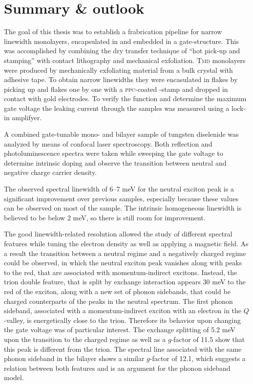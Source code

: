 \chapter{Summary \& outlook}

The goal of this thesis was to establish a frabrication pipeline for narrow linewidth \tmdg monolayers, encapsulated in \hbng and embedded in a gate-structure. This was accomplished by combining the dry transfer technique of ``hot pick-up and stamping'' \cite{pizzocchero_hot_2016, tien_study_2016} with contact lithography and mechanical exfoliation. \textsc{Tmd} monolayers were produced by mechanically exfoliating material from a bulk crystal with adhesive tape. To obtain narrow linewidths they were encasulated in \hbng flakes by picking up \hbng and \tmdg flakes one by one with a \textsc{ppc}-coated \pdms-stamp and dropped in contact with gold electrodes. To verify the function and determine the maximum gate voltage the leaking current through the samples was measured using a lock-in amplifyer.

A combined gate-tunable mono- and bilayer sample of tungsten diselenide was analyzed by means of confocal laser spectroscopy. Both reflection and photoluminescence spectra were taken while sweeping the gate voltage to determine intrinsic doping and observe the transition between neutral and negative charge carrier density.

The observed spectral linewidth of 6--7 meV for the neutral exciton peak is a significant improvement over previous samples, especially because these values can be observed on most of the sample. The intrinsic homogeneous linewidth is believed to be below 2 meV, so there is still room for improvement.

The good linewidth-related resolution allowed the study of different spectral features while tuning the electron density as well as applying a magnetic field. As a result the transition between a neutral regime and a negatively charged regime could be observed, in which the neutral exciton peak vanishes along with peaks to the red, that are associated with momentum-indirect excitons. Instead, the trion double feature, that is split by exchange interaction appears 30 meV to the red of the exciton, along with a new set of phonon sidebands, that could be charged counterparts of the peaks in the neutral spectrum. The first phonon sideband, associated with a momentum-indirect exciton with an electron in the $Q$-valley, is energetically close to the trion. Therefore its behavior upon changing the gate voltage was of particular interest. The exchange splitting of 5.2 meV upon the transition to the charged regime as well as a $g$-factor of 11.5 show that this peak is different from the trion. The spectral line associated with the same phonon sideband in the bilayer shows a similar $g$-factor of 12.1, which suggests a relation between both features and is an argument for the phonon sideband model.

